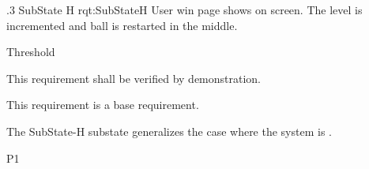 \ONERQMTV
{\RqtNumberBase.3}
{SubState H}
{rqt:SubStateH}
{User win page shows on screen. The level is incremented and ball is restarted in the middle.}
{
	\item [Phase 1] Threshold
}
{This requirement shall be verified by demonstration.}
{
	\item [N/A] This requirement is a base requirement.
}
{
	\item The SubState-H substate generalizes the case where the system is \TBD.
}
{P1}

